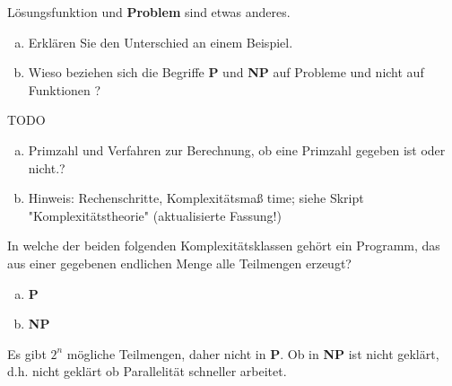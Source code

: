 \begin{card}
	Lösungsfunktion und \textbf{Problem} sind etwas anderes.
	\begin{enumerate}[a)]
	\item Erklären Sie den Unterschied an einem Beispiel.
	\item Wieso beziehen sich die Begriffe \textbf{P} und \textbf{NP} auf Probleme und nicht auf Funktionen ? 
	\end{enumerate}
	\hr 
	TODO
	\begin{enumerate}[a)]
	\item Primzahl und Verfahren zur Berechnung, ob eine Primzahl gegeben ist oder nicht.?
	\item Hinweis: Rechenschritte, Komplexitätsmaß time; siehe Skript
	"Komplexitätstheorie" (aktualisierte Fassung!) 
	\end{enumerate}
\end{card}


\begin{card}
	In welche der beiden folgenden Komplexitätsklassen gehört ein Programm, das aus einer
	gegebenen endlichen Menge alle Teilmengen erzeugt?
	\begin{enumerate}[a)]
	\item \textbf{P}
	\item \textbf{NP}
	\end{enumerate}
	\hr
	Es gibt $2^n$ mögliche Teilmengen, daher nicht in \textbf{P}. Ob in \textbf{NP} ist nicht geklärt, d.h. nicht geklärt ob Parallelität schneller arbeitet.
\end{card}

